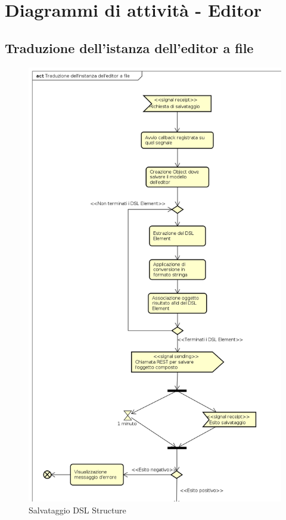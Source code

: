 \section{Diagrammi di attività - Editor}
    \subsection{Traduzione dell'istanza dell'editor a file}
    \begin{figure}[H]
      \centering
      \includegraphics[width=.7\textwidth]{res/img/salvataggio.png}
      \caption{Salvataggio DSL Structure}
      \label{fig:salvataggio}
    \end{figure}
